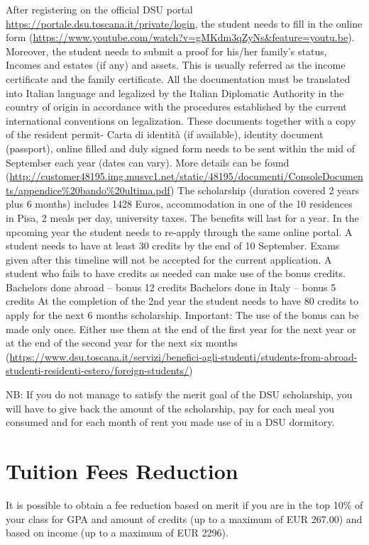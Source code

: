 \documentclass[11pt,fleqn,oneside]{book} %
\begin{document}
After registering on the official DSU portal \url{https://portale.dsu.toscana.it/private/login}, the student needs to fill in the online form (\url{https://www.youtube.com/watch?v=gMKdm3qZyNs&feature=youtu.be}). Moreover, the student needs to submit a proof for his/her family’s status, Incomes and estates (if any) and assets. This is usually referred as the income certificate and the family certificate. All the documentation must be translated into Italian language and legalized by the Italian Diplomatic Authority in the country of origin in accordance with the procedures established by the current international conventions on legalization. These documents together with a copy of the resident permit- Carta di identità (if available), identity document (passport), online filled and duly signed form needs to be sent within the mid of September each year (dates can vary).
More details can be found (\url{http://customer48195.img.musvc1.net/static/48195/documenti/ConsoleDocuments/appendice%20bando%20ultima.pdf})
The scholarship (duration covered 2 years plus 6 months) includes 1428 Euros, accommodation in one of the 10 residences in Pisa, 2 meals per day, university taxes. The benefits will last for a year. In the upcoming year the student needs to re-apply through the same online portal. A student needs to have at least 30 credits by the end of 10 September. Exams given after this timeline will not be accepted for the current application. A student who fails to have credits as needed can make use of the bonus credits.
Bachelors done abroad – bonus 12 credits
Bachelors done in Italy – bonus 5 credits
At the completion of the 2nd year the student needs to have 80 credits to apply for the next 6 months scholarship.
Important: The use of the bonus can be made only once. Either use them at the end of the first year for the next year or at the end of the second year for the next six months
(\url{https://www.dsu.toscana.it/servizi/benefici-agli-studenti/students-from-abroad-studenti-residenti-estero/foreign-students/})

NB: If you do not manage to satisfy the merit goal of the DSU scholarship, you will have to give back the amount of the scholarship, pay for each meal you consumed and for each month of rent you made use of in a DSU dormitory. 



\section{Tuition Fees Reduction}
It is possible to obtain a fee reduction based on merit if you are in the top 10\% of your class for GPA and amount of credits (up to a maximum of EUR 267.00) and based on income (up to a maximum of EUR 2296).
\end{document}
